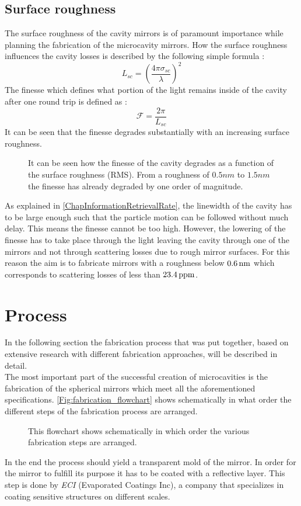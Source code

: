 \subsection{Surface roughness}
The surface roughness of the cavity mirrors is of paramount importance while planning the fabrication of the microcavity mirrors. How the surface roughness influences the cavity losses is described by the following simple formula \cite{roy2011fabrication}:
\begin{equation}
	L_{\si{sc}}=\left(\frac{4\pi\sigma_{\si{sc}}}{\lambda}\right)^2
\end{equation}
The finesse which defines what portion of the light remains inside of the cavity after one round trip is defined as \cite{roy2011fabrication}:
\begin{equation}
	\mathcal{F}=\frac{2\pi}{L_{\si{sc}}}
\end{equation}
It can be seen that the finesse degrades substantially with an increasing surface roughness.
\begin{figure}[H]
	
	\caption{It can be seen how the finesse of the cavity degrades as a function of the surface roughness (RMS). From a roughness of $0.5\si{nm}$ to $1.5\si{nm}$ the finesse has already degraded by one order of magnitude.}
\end{figure}
As explained in \autoref{ChapInformationRetrievalRate}, the linewidth of the cavity has to be large enough such that the particle motion can be followed without much delay. This means the finesse cannot be too high. However, the lowering of the finesse has to take place through the light leaving the cavity through one of the mirrors and not through scattering losses due to rough mirror surfaces. For this reason the aim is to fabricate mirrors with a roughness below $0.6\nm$ which corresponds to scattering losses of less than $23.4\ppm$.
\newpage

\section{Process}
In the following section the fabrication process that was put together, based on extensive research with different fabrication approaches, will be described in detail.\\
The most important part of the successful creation of microcavities is the fabrication of the spherical mirrors which meet all the aforementioned specifications. \autoref{Fig:fabrication_flowchart} shows schematically in what order the different steps of the fabrication process are arranged.
\begin{figure}[H]
	
	\caption{This flowchart shows schematically in which order the various fabrication steps are arranged.}
	\label{Fig:fabrication_flowchart}
\end{figure}
In the end the process should yield a transparent mold of the mirror. In order for the mirror to fulfill its purpose it has to be coated with a reflective layer. This step is done by \textit{ECI} (Evaporated Coatings Inc), a company that specializes in coating sensitive structures on different scales.
